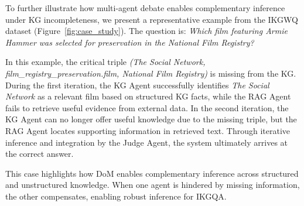 To further illustrate how multi-agent debate enables complementary inference under KG incompleteness, we present a representative example from the IKGWQ dataset (Figure~\ref{fig:case_study}). The question is: \emph{Which film featuring Armie Hammer was selected for preservation in the National Film Registry?}

In this example, the critical triple \emph{(The Social Network, film\_registry\_preservation.film, National Film Registry)} is missing from the KG. During the first iteration, the KG Agent successfully identifies \emph{The Social Network} as a relevant film based on structured KG facts, while the RAG Agent fails to retrieve useful evidence from external data. In the second iteration, the KG Agent can no longer offer useful knowledge due to the missing triple, but the RAG Agent locates supporting information in retrieved text. Through iterative inference and integration by the Judge Agent, the system ultimately arrives at the correct answer.

This case highlights how DoM enables complementary inference across structured and unstructured knowledge. When one agent is hindered by missing information, the other compensates, enabling robust inference for IKGQA.